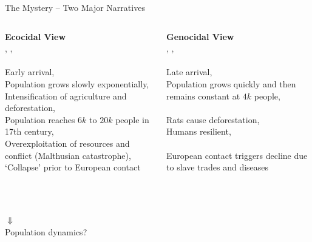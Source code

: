 \begin{frame}{The Mystery -- Two Major Narratives}
\begin{columns}
		\begin{column}{0.4\textwidth}
		\textbf{Ecocidal View}\\ \citet{Brander1998}, \citet{Diamond2011}, \citet{Bahn2017} \\ \ \\
		Early arrival, \\ 
		\ra Population grows slowly exponentially, \\
		\ra Intensification of agriculture and deforestation, \\
		\ra Population reaches $6k$ to $20k$ people in 17th century, \\ 
		\ra Overexploitation of resources and conflict (Malthusian catastrophe),
		\\
		\ra `Collapse' prior to European contact
	\end{column}


	\begin{column}{0.4\textwidth}
		\textbf{Genocidal View}\\ \citet{Peiser2005}, \citet{Hunt2007}, \citet{Basener2008}\\ \  \\
		Late arrival, \\
		\ra Population grows quickly and then remains constant at $4k$ people, \\
		\ \\
		\ra Rats cause deforestation, \\
		\ra Humans resilient, \\
		 \ \\
		\ra European contact triggers decline due to slave trades and diseases \\
		 \ \\
		 \ \\
		 

	\end{column}

\end{columns}
\centering
{\color{red}$\Downarrow$}\\
{\color{red} Population dynamics?}
\end{frame}


